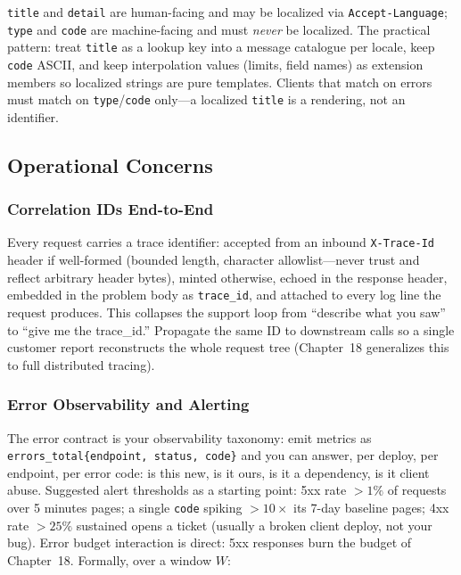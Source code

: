 \texttt{title} and \texttt{detail} are human-facing and may be localized via
\texttt{Accept-Language}; \texttt{type} and \texttt{code} are machine-facing
and must \emph{never} be localized. The practical pattern: treat
\texttt{title} as a lookup key into a message catalogue per locale, keep
\texttt{code} ASCII, and keep interpolation values (limits, field names) as
extension members so localized strings are pure templates. Clients that
match on errors must match on \texttt{type}/\texttt{code} only---a localized
\texttt{title} is a rendering, not an identifier.

\subsection{Operational Concerns}

\subsubsection{Correlation IDs End-to-End}

Every request carries a trace identifier: accepted from an inbound
\texttt{X-Trace-Id} header if well-formed (bounded length, character
allowlist---never trust and reflect arbitrary header bytes), minted otherwise,
echoed in the response header, embedded in the problem body as
\texttt{trace\_id}, and attached to every log line the request produces.
This collapses the support loop from ``describe what you saw'' to ``give me
the trace\_id.'' Propagate the same ID to downstream calls so a single
customer report reconstructs the whole request tree (Chapter~18 generalizes
this to full distributed tracing).

\subsubsection{Error Observability and Alerting}

The error contract is your observability taxonomy: emit metrics as
\texttt{errors\_total\{endpoint, status, code\}} and you can answer, per
deploy, per endpoint, per error code: is this new, is it ours, is it a
dependency, is it client abuse. Suggested alert thresholds as a starting
point: 5xx rate $> 1\%$ of requests over 5 minutes pages; a single
\texttt{code} spiking $> 10\times$ its 7-day baseline pages; 4xx rate $>
25\%$ sustained opens a ticket (usually a broken client deploy, not your
bug). Error budget interaction is direct: 5xx responses burn the budget of
Chapter~18. Formally, over a window $W$:

